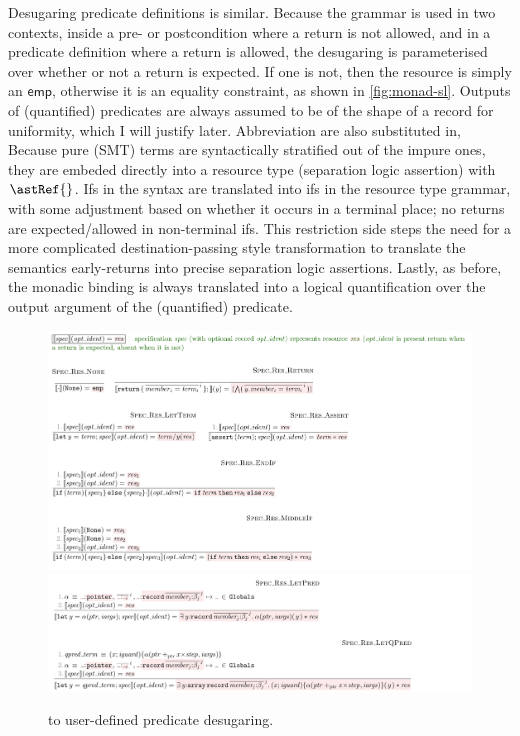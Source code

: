 Desugaring predicate definitions is similar. Because the grammar is used in two
contexts, inside a pre- or postcondition where a return is not allowed, and in
a predicate definition where a return is allowed, the desugaring is
parameterised over whether or not a return is expected. If one is not, then the
resource is simply an $\mathsf{emp}$, otherwise it is an equality constraint,
as shown in \cref{fig:monad-sl}. Outputs of (quantified) predicates are always
assumed to be of the shape of a record for uniformity, which I will justify
later. Abbreviation are also substituted in,
Because pure (SMT) terms are syntactically stratified out of
the impure ones, they are embeded directly into a resource type (separation
logic assertion) with $\astRef{}$. Ifs in the syntax are translated into ifs in
the resource type grammar, with some adjustment based on whether it occurs in a
terminal place; no returns are expected/allowed in non-terminal
ifs. This restriction side steps the need for a more complicated
destination-passing style  transformation to
translate the semantics early-returns into precise separation logic
assertions. Lastly, as before, the monadic binding  is %
always translated into a logical quantification over the output argument of the
(quantified) predicate.

\begin{figure}[tp]
    \includegraphics{figures/predicate-to-kernel-1}
    \includegraphics{figures/predicate-to-kernel-2}
    \caption{ to  user-defined predicate desugaring.}\label{fig:pred-to-kernel}
\end{figure}

